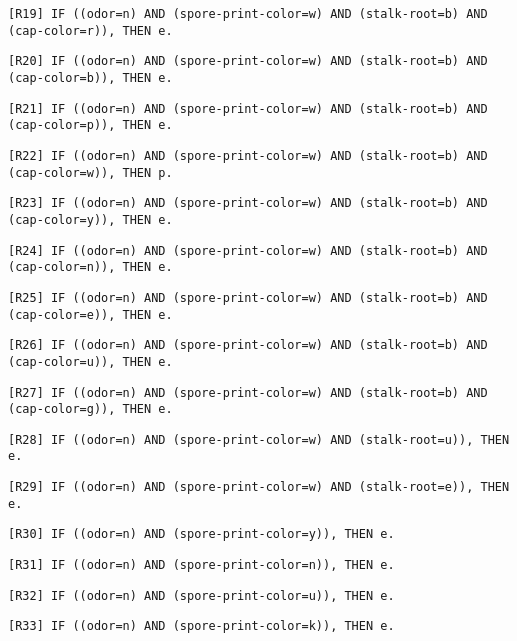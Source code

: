 \documentclass{IEEEtran}
\begin{document}
\texttt{[R19] IF ((odor=n) AND (spore-print-color=w) AND (stalk-root=b) AND
(cap-color=r)), THEN e.}

\texttt{[R20] IF ((odor=n) AND (spore-print-color=w) AND (stalk-root=b) AND
(cap-color=b)), THEN e.}

\texttt{[R21] IF ((odor=n) AND (spore-print-color=w) AND (stalk-root=b) AND
(cap-color=p)), THEN e.}

\texttt{[R22] IF ((odor=n) AND (spore-print-color=w) AND (stalk-root=b) AND
(cap-color=w)), THEN p.}

\texttt{[R23] IF ((odor=n) AND (spore-print-color=w) AND (stalk-root=b) AND
(cap-color=y)), THEN e.}

\texttt{[R24] IF ((odor=n) AND (spore-print-color=w) AND (stalk-root=b) AND
(cap-color=n)), THEN e.}

\texttt{[R25] IF ((odor=n) AND (spore-print-color=w) AND (stalk-root=b) AND
(cap-color=e)), THEN e.}

\texttt{[R26] IF ((odor=n) AND (spore-print-color=w) AND (stalk-root=b) AND
(cap-color=u)), THEN e.}

\texttt{[R27] IF ((odor=n) AND (spore-print-color=w) AND (stalk-root=b) AND
(cap-color=g)), THEN e.}

\texttt{[R28] IF ((odor=n) AND (spore-print-color=w) AND (stalk-root=u)), THEN
e.}

\texttt{[R29] IF ((odor=n) AND (spore-print-color=w) AND (stalk-root=e)), THEN
e.}

\texttt{[R30] IF ((odor=n) AND (spore-print-color=y)), THEN e.}

\texttt{[R31] IF ((odor=n) AND (spore-print-color=n)), THEN e.}

\texttt{[R32] IF ((odor=n) AND (spore-print-color=u)), THEN e.}

\texttt{[R33] IF ((odor=n) AND (spore-print-color=k)), THEN e.}
\end{document}
